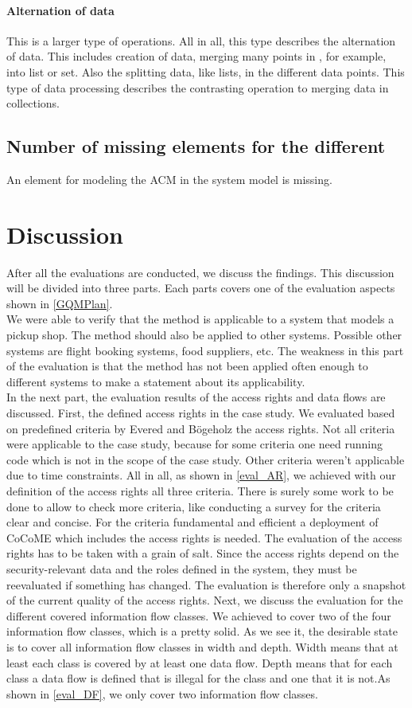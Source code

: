 \paragraph{Alternation of data}
This is a larger type of operations. All in all, this type describes the alternation of data. This includes
creation of data, merging many points in , for example, into list or set. Also the splitting data, like lists, in the different data points. This type of data processing describes the contrasting operation to merging data in collections. 
\subsection{Number of missing elements for the different }
An element for modeling the ACM in the system model is missing.
\section{Discussion}
After all the evaluations are conducted, we discuss the findings. This discussion will be divided into three parts. Each parts covers one of the evaluation aspects shown in \autoref{GQMPlan}.\\
We were able to verify that the method is applicable to a system that models a pickup shop. The method should also be applied to other systems. Possible other systems are flight booking systems, food suppliers, etc. The weakness in this part of the evaluation is that the method has not been applied often enough to different systems to make a statement about its applicability.\\
In the next part, the evaluation results of the access rights and data flows are discussed. First, the defined access rights in the case study. We evaluated based on predefined criteria by Evered and Bögeholz \cite{CaseStudyAndAccessrigths} the access rights. Not all criteria were applicable to the case study, because for some criteria one need running code which is not in the scope of the case study. Other criteria weren't applicable due to time constraints. All in all, as shown in \autoref{eval_AR}, we achieved with our definition of the access rights all three criteria. There is surely some work to be done to allow to check more criteria, like conducting a survey for the criteria clear and concise. For the criteria fundamental and efficient a deployment of CoCoME which includes the access rights is needed. The evaluation of the access rights has to be taken with a grain of salt. Since the access rights depend on the security-relevant data and the roles defined in the system, they must be reevaluated if something has changed.  The evaluation is therefore only a snapshot of the current quality of the access rights. Next, we discuss the evaluation for the different covered information flow classes. We achieved to cover two of the four information flow classes, which is a pretty solid. As we see it, the desirable state is to cover all information flow classes in width and depth. Width means that at least each class is covered by at least one data flow. Depth means that for each class a data flow is defined that is illegal for the class and one that it is not.As shown in \autoref{eval_DF}, we only cover two information flow classes. 
